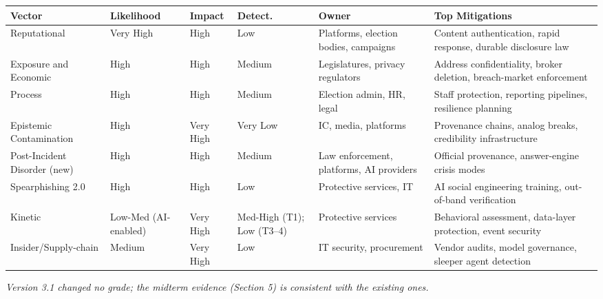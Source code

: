 \documentclass[11pt,letterpaper]{article}
\begin{document}
{\footnotesize
\begin{longtable}{L{2.3cm}L{1.7cm}L{1.4cm}L{1.7cm}L{2.6cm}L{4.4cm}}
\toprule
\textbf{Vector} & \textbf{Likelihood} & \textbf{Impact} & \textbf{Detect.} & \textbf{Owner} & \textbf{Top Mitigations} \\
\midrule
\endhead
\bottomrule
\endlastfoot
Reputational & Very High & High & Low & Platforms, election bodies, campaigns & Content authentication, rapid response, durable disclosure law \\
Exposure and Economic & High & High & Medium & Legislatures, privacy regulators & Address confidentiality, broker deletion, breach-market enforcement \\
Process & High & High & Medium & Election admin, HR, legal & Staff protection, reporting pipelines, resilience planning \\
Epistemic Contamination & High & Very High & Very Low & IC, media, platforms & Provenance chains, analog breaks, credibility infrastructure \\
Post-Incident Disorder (new) & High & High & Medium & Law enforcement, platforms, AI providers & Official provenance, answer-engine crisis modes \\
Spearphishing 2.0 & High & High & Low & Protective services, IT & AI social engineering training, out-of-band verification \\
Kinetic & Low-Med (AI-enabled) & Very High & Med-High (T1); Low (T3--4) & Protective services & Behavioral assessment, data-layer protection, event security \\
Insider/Supply-chain & Medium & Very High & Low & IT security, procurement & Vendor audits, model governance, sleeper agent detection \\
\end{longtable}}

\textit{Version 3.1 changed no grade; the midterm evidence (Section 5) is consistent with the existing ones.}
\end{document}
